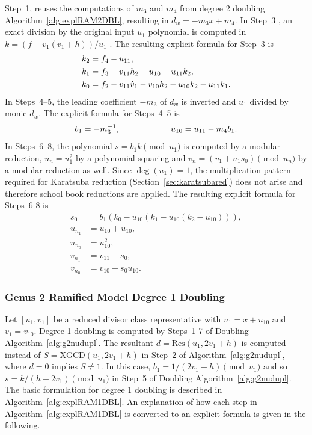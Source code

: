 Step~1, reuses the computations of $m_3$ and $m_4$ from  degree 2 doubling
Algorithm~\ref{alg:explRAM2DBL}, resulting in $d_w = -m_3x + m_4$. In Step~3 ,
an exact division by the original input $u_1$ polynomial is computed in $k = (f
- v_1(v_1 + h))/u_1$ . The resulting explicit formula for Step~3 is 
\begin{align*}
    k_2 &= f_4 - u_{11},\\
    k_1 &= f_3 - v_{11}h_2 - u_{10} - u_{11}k_2,\\
    k_0 &= f_2 - v_{11}\hat{v}_1 - v_{10}h_2 - u_{10}k_2 - u_{11}k_1.
\end{align*} In Steps~4--5, the leading coefficient $-m_3$ of $d_w$ is inverted and $u_1$
divided by monic $d_w$. The explicit formula for Steps~4--5 is $$b_1 =
-m_3^{-1}, \quad\quad\quad\quad\quad\quad u_{10} = u_{11} - m_4b_1.$$ In Steps~6--8, the
polynomial $s = b_1k \pmod{u_1}$ is computed by a modular reduction, $u_n =
u_1^2$ by a polynomial squaring and $v_n = (v_1 + u_1s_0) \pmod{u_n}$ by a
modular reduction as well. Since $\deg(u_1) = 1$, the multiplication pattern
required for Karatsuba reduction (Section~\ref{sec:karatsubared}) does not arise
and therefore school book reductions are applied.  The resulting explicit
formula for Steps~6-8 is
\begin{align*}
    s_0 &= b_1(k_0 - u_{10}(k_1 - u_{10}(k_2 - u_{10}))),\\
u_{n_1} &= u_{10} + u_{10},\\
u_{n_0} &= u_{10}^2,\\
v_{n_1} &= v_{11} + s_0,\\
v_{n_0} &= v_{10} + s_0u_{10}.    
\end{align*}


\subsubsection{Genus 2 Ramified Model Degree 1 Doubling}
Let $[u_1,v_1]$ be a reduced divisor class representative with $u_1 = x +
u_{10}$ and $v_1 = v_{10}$.  Degree 1 doubling is computed by Steps~1-7 of
Doubling Algorithm~\ref{alg:g2nudupl}. The resultant $d =
\mathrm{Res}(u_1,2v_1+h)$ is computed instead of $S = \mathrm{XGCD}(u_1,2v_1 +
h)$ in Step~2 of Algorithm~\ref{alg:g2nudupl}, where $d=0$ implies $S \neq 1$.
In this case, $b_1 = 1/(2v_1 + h) \pmod{u_1}$ and so $s = k/(h + 2v_1)
\pmod{u_1}$ in Step~5 of Doubling Algorithm~\ref{alg:g2nudupl}. The basic
formulation for degree 1 doubling is described in
Algorithm~\ref{alg:explRAM1DBL}. An explanation of how each step in
Algorithm~\ref{alg:explRAM1DBL} is converted to an explicit formula is given in
the following.


